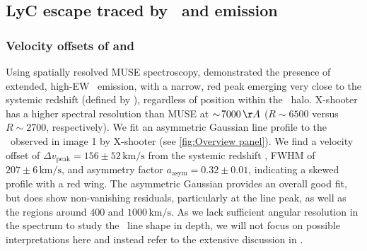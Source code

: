 \subsection{LyC escape traced by \texorpdfstring{\lya\ and \MgII}{\lyatext and MgII} emission}
\label{ssec:Discussion: Lya and MgII}

\subsubsection{Velocity offsets of \texorpdfstring{\lya}{\lyatext} and {\MgII} }
\label{sssec:Lya}

Using spatially resolved MUSE spectroscopy, \citet{2017MNRAS.467.3306S} demonstrated the presence of extended, high-EW \lya\ emission, with a narrow, red peak emerging very close to the systemic redshift (defined by \OII), regardless of position within the \lya\ halo. X-shooter has a higher spectral resolution than MUSE at $\ssim 7000 \, \Angstrom$ ($R \sim 6500$ versus $R \sim 2700$, respectively). We fit an asymmetric Gaussian line profile \citep[see e.g.][]{2014ApJ...788...74S} to the \lya\ observed in image 1 by X-shooter (see \cref{fig:Overview panel}). We find a velocity offset of $\Delta v_\text{peak} = 156 \pm 52 \, \mathrm{km/s}$ from the systemic redshift \citep[in agreement with][]{2017MNRAS.467.3306S}, FWHM of $207 \pm 6 \, \mathrm{km/s}$, and asymmetry factor $a_\text{asym} = 0.32 \pm 0.01$, indicating a skewed profile with a red wing. The asymmetric Gaussian provides an overall good fit, but does show non-vanishing residuals, particularly at the line peak, as well as the regions around $400$ and $1000 \, \mathrm{km/s}$. As we lack sufficient angular resolution in the spectrum to study the \lya\ line shape in depth, we will not focus on possible interpretations here and instead refer to the extensive discussion in \citet[][]{2017MNRAS.467.3306S}.

